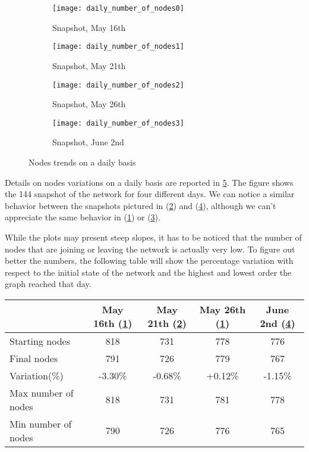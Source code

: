 	\begin{figure}[h]
		\centering
		\begin{subfigure}{0.45\textwidth}
			\centering
			\texttt{[image: daily\_number\_of\_nodes0]}
			\caption{Snapshot, May 16th}
			\label{daily_node0}
		\end{subfigure}
		\begin{subfigure}{0.45\textwidth}
			\centering
			\texttt{[image: daily\_number\_of\_nodes1]}
			\caption{Snapshot, May 21th}
			\label{daily_node1}
		\end{subfigure}
			\begin{subfigure}{0.45\textwidth}
			\centering
			\texttt{[image: daily\_number\_of\_nodes2]}
			\caption{Snapshot, May 26th}
			\label{daily_node2}
		\end{subfigure}
		\begin{subfigure}{0.45\textwidth}
			\centering
			\texttt{[image: daily\_number\_of\_nodes3]}
			\caption{Snapshot, June 2nd}
			\label{daily_node3}
		\end{subfigure}
		
		\caption{Nodes trends on a daily basis}
		\label{daily_nodes_variation}
	\end{figure}

	Details on nodes variations on a daily basis are reported in \ref{daily_nodes_variation}. The figure shows the 144 snapshot of the network for four different days. We can notice a similar behavior between the snapshots pictured in (\ref{daily_node1}) and (\ref{daily_node3}), although we can't appreciate the same behavior in (\ref{daily_node0}) or (\ref{daily_node2}). 
	
	While the plots may present steep slopes, it has to be noticed that the number of nodes that are joining or leaving the network is actually very low. To figure out better the numbers, the following table will show the percentage variation with respect to the initial state of the network and the highest and lowest order the graph reached that day.
	
	\begin{center}
		\begin{tabulary}{\linewidth}{| L | C | C | C | C |}
			\hline
			 & May 16th (\ref{daily_node0}) & May 21th (\ref{daily_node1}) & May 26th (\ref{daily_node0}) & June 2nd (\ref{daily_node3}) \\
			\hline
			Starting nodes & 818 & 731 & 778 & 776 \\ \hline
			Final nodes & 791 & 726 & 779 & 767 \\ \hline
			Variation(\%) & -3.30\% & -0.68\% & +0.12\% & -1.15\% \\ \hline
			Max number of nodes & 818 & 731 & 781 & 778 \\ \hline
			Min number of nodes & 790 & 726 & 776 & 765 \\ \hline

		\end{tabulary}
	\end{center}
	
